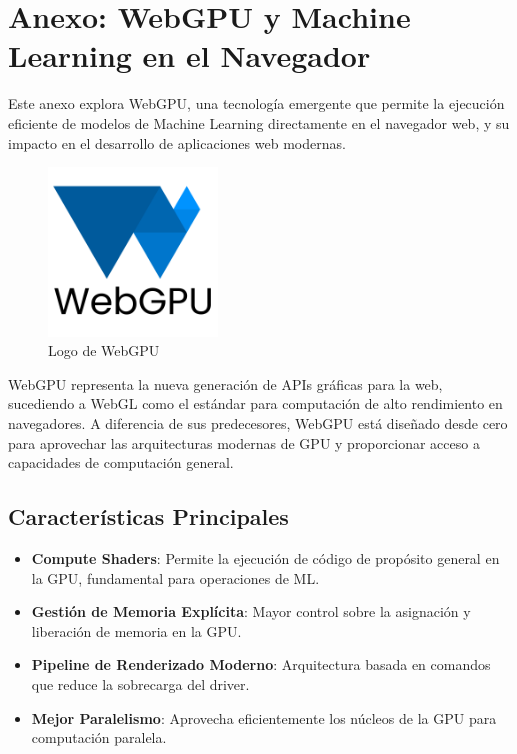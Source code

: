 \chapter{Anexo: WebGPU y Machine Learning en el Navegador}
\label{anexo-webgpu}

Este anexo explora WebGPU, una tecnología emergente que permite la ejecución eficiente de modelos de Machine Learning directamente en el navegador web, y su impacto en el desarrollo de aplicaciones web modernas.

\begin{figure}[H]
    \centering
    \includegraphics[width=0.4\textwidth]{figuras/webgpu.png}
    \caption{Logo de WebGPU}
    \label{fig:webgpu-logo}
\end{figure}

WebGPU representa la nueva generación de APIs gráficas para la web, sucediendo a WebGL como el estándar para computación de alto rendimiento en navegadores. A diferencia de sus predecesores, WebGPU está diseñado desde cero para aprovechar las arquitecturas modernas de GPU y proporcionar acceso a capacidades de computación general.

\section{Características Principales}
\begin{itemize}
    \item \textbf{Compute Shaders}: Permite la ejecución de código de propósito general en la GPU, fundamental para operaciones de ML.
    \item \textbf{Gestión de Memoria Explícita}: Mayor control sobre la asignación y liberación de memoria en la GPU.
    \item \textbf{Pipeline de Renderizado Moderno}: Arquitectura basada en comandos que reduce la sobrecarga del driver.
    \item \textbf{Mejor Paralelismo}: Aprovecha eficientemente los núcleos de la GPU para computación paralela.
\end{itemize}


